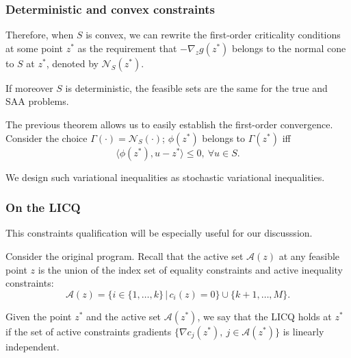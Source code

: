 \begin{frame}
\frametitle{Deterministic and convex constraints}

Therefore, when $S$ is convex, we can rewrite the first-order criticality conditions at some point $z^*$ as the requirement that $-\nabla_z g(z^*)$ belongs to the normal cone to $S$ at $z^*$, denoted by $\mathcal{N}_{S}(z^*)$.

\mbox{}

If moreover $S$ is deterministic, the feasible sets are the same for the true and SAA problems.

\mbox{}

The previous theorem allows us to easily establish the first-order convergence.
Consider the choice $\Gamma(\cdot) = \mathcal{N}_S(\cdot)$; $\phi(z^*)$ belongs to $\Gamma(z^*)$ iff
\[
\langle \phi(z^*), u-z^*\rangle \leq 0,\ \forall u \in S.
\]

We design such variational inequalities as stochastic variational inequalities.

\end{frame}

\begin{frame}
	\frametitle{On the LICQ}
	
	This constraints qualification will be especially useful for our discusssion.
	
	\mbox{}
	
	Consider the original program.
	Recall that the active set $\mathcal{A}(z)$ at any feasible point $z$ is the union of the index set of equality constraints and active inequality constraints:
	\[
	\mathcal{A}(z) = \lbrace i \in \lbrace 1,\ldots,k \rbrace \, | \,
	c_i(z) = 0 \rbrace \cup \lbrace k+1,\ldots,M \rbrace.
	\]
	
	\begin{defi}
		Given the point $z^*$ and the active set $\mathcal{A}(z^*)$, we say that the LICQ holds at $z^*$ if the set of active constraints gradients $\lbrace \nabla c_j(z^*),\ j \in \mathcal{A}(z^*) \rbrace$ is linearly independent.
	\end{defi}
	
\end{frame}

